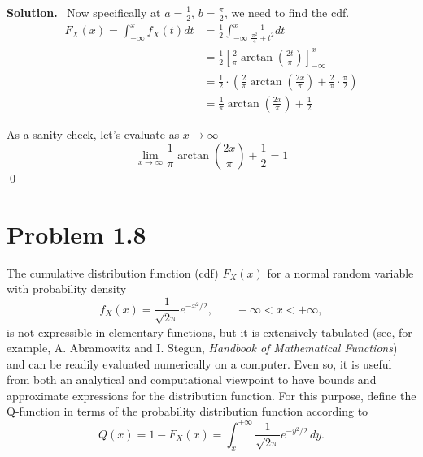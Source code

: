 \documentclass[11pt]{article}
\newenvironment{solution}{\par\noindent\textbf{Solution.}\ }{\par\vspace{6pt}}
\begin{document}
\begin{enumerate}[label=(\alph*)]
\begin{solution}
        Now specifically at $a = \frac{1}{2}$, $b = \frac{\pi}{2}$, we need to find the cdf.
        \begin{align}
            F_X(x) = \int_{-\infty}^{x} f_X(t) dt &= \frac{1}{2} \int_{-\infty}^{x} \frac{1}{\frac{\pi^2}{4} + t^2} dt \\
            &= \frac{1}{2} \left[\frac{2}{\pi}\arctan(\frac{2t}{\pi})\right]_{-\infty}^{x} \\
            &= \frac{1}{2} \cdot \left(\frac{2}{\pi}\arctan(\frac{2x}{\pi}) + \frac{2}{\pi}\cdot\frac{\pi}{2}\right) \\
            &= \frac{1}{\pi} \arctan(\frac{2x}{\pi}) + \frac{1}{2}
        \end{align}

        As a sanity check, let's evaluate as $x \to \infty$
        \[
            \lim_{x \to \infty} \frac{1}{\pi} \arctan\left(\frac{2x}{\pi}\right) + \frac{1}{2} = 1
        \]
        \qed
    \end{solution}

    \end{enumerate}

    \newpage
    \section*{Problem 1.8}

    The cumulative distribution function (cdf) $F_X(x)$ for a normal random variable with probability density
    \[
        f_X(x) = \frac{1}{\sqrt{2\pi}} e^{-x^2/2}, \qquad -\infty < x < +\infty,
    \]
    is not expressible in elementary functions, but it is extensively tabulated (see, for example, A. Abramowitz and I. Stegun, \emph{Handbook of Mathematical Functions}) and can be readily evaluated numerically on a computer. Even so, it is useful from both an analytical and computational viewpoint to have bounds and approximate expressions for the distribution function. For this purpose, define the Q-function in terms of the probability distribution function according to
    \[
        Q(x) = 1 - F_X(x) = \int_x^{+\infty} \frac{1}{\sqrt{2\pi}} e^{-y^2/2}\, dy.
    \]
\end{document}
